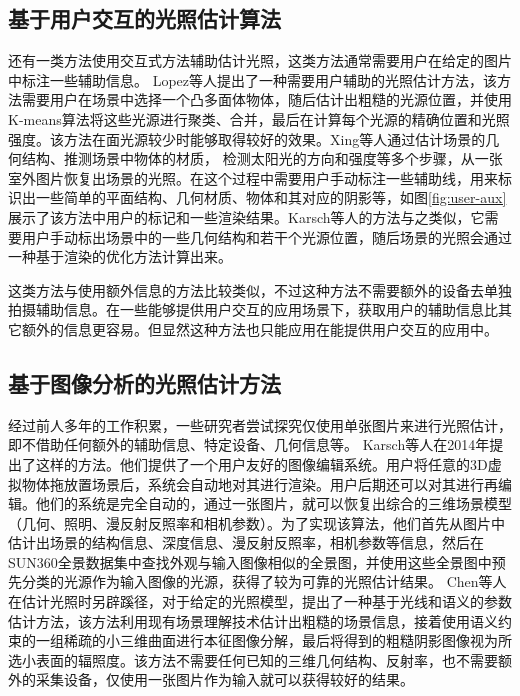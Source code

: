 \subsection{基于用户交互的光照估计算法}
还有一类方法使用交互式方法辅助估计光照，这类方法通常需要用户在给定的图片中标注一些辅助信息。
Lopez等人\cite{lopez2010compositing}提出了一种需要用户辅助的光照估计方法，该方法需要用户在场景中选择一个凸多面体物体，随后估计出粗糙的光源位置，并使用K-means算法将这些光源进行聚类、合并，最后在计算每个光源的精确位置和光照强度。该方法在面光源较少时能够取得较好的效果。Xing等人\cite{xing2013lighting}通过估计场景的几何结构、推测场景中物体的材质， 检测太阳光的方向和强度等多个步骤，从一张室外图片恢复出场景的光照。在这个过程中需要用户手动标注一些辅助线，用来标识出一些简单的平面结构、几何材质、物体和其对应的阴影等，如图\ref{fig:user-aux}展示了该方法中用户的标记和一些渲染结果。Karsch等人\cite{karsch2011rendering}的方法与之类似，它需要用户手动标出场景中的一些几何结构和若干个光源位置，随后场景的光照会通过一种基于渲染的优化方法计算出来。


这类方法与使用额外信息的方法比较类似，不过这种方法不需要额外的设备去单独拍摄辅助信息。在一些能够提供用户交互的应用场景下，获取用户的辅助信息比其它额外的信息更容易。但显然这种方法也只能应用在能提供用户交互的应用中。
\subsection{基于图像分析的光照估计方法}
经过前人多年的工作积累，一些研究者尝试探究仅使用单张图片来进行光照估计，即不借助任何额外的辅助信息、特定设备、几何信息等。
Karsch等人\cite{karsch2014automatic}在2014年提出了这样的方法。他们提供了一个用户友好的图像编辑系统。用户将任意的3D虚拟物体拖放置场景后，系统会自动地对其进行渲染。用户后期还可以对其进行再编辑。他们的系统是完全自动的，通过一张图片，就可以恢复出综合的三维场景模型（几何、照明、漫反射反照率和相机参数）。为了实现该算法，他们首先从图片中估计出场景的结构信息、深度信息、漫反射反照率，相机参数等信息，然后在SUN360全景数据集\cite{xiao2012recognizing}中查找外观与输入图像相似的全景图，并使用这些全景图中预先分类的光源作为输入图像的光源，获得了较为可靠的光照估计结果。
Chen等人\cite{chen2014lighting}在估计光照时另辟蹊径，对于给定的光照模型，提出了一种基于光线和语义的参数估计方法，该方法利用现有场景理解技术估计出粗糙的场景信息，接着使用语义约束的一组稀疏的小三维曲面进行本征图像分解，最后将得到的粗糙阴影图像视为所选小表面的辐照度。该方法不需要任何已知的三维几何结构、反射率，也不需要额外的采集设备，仅使用一张图片作为输入就可以获得较好的结果。

